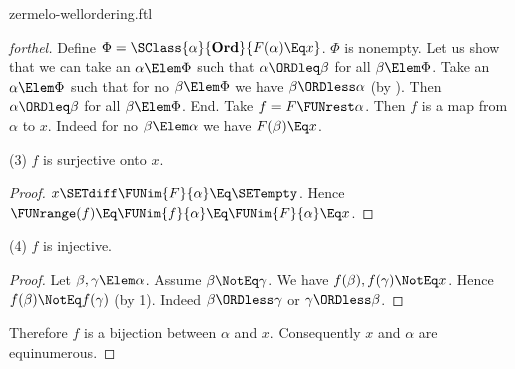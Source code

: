 \documentclass{stex}
\newcommand\Ord{\textbf{Ord}}
\begin{document}
\begin{smodule}{zermelo-wellordering.ftl}
\begin{proof}[forthel]
  Define $\Phi = \SClass{\alpha}{\Ord}{F(\alpha) \Eq x}$.
  $\Phi$ is nonempty.
  Let us show that we can take an $\alpha \Elem \Phi$ such that $\alpha \ORDleq \beta$ for all $\beta \Elem \Phi$.
    Take an $\alpha \Elem \Phi$ such that for no $\beta \Elem \Phi$ we have $\beta \ORDless \alpha$ (by ).
    Then $\alpha \ORDleq \beta$ for all $\beta \Elem \Phi$.
  End.
  Take $f = F \FUNrest \alpha$.
  Then $f$ is a map from $\alpha$ to $x$.
  Indeed for no $\beta \Elem \alpha$ we have $F(\beta) \Eq x$.

  (3) $f$ is surjective onto $x$.
  \begin{proof}
    $x \SETdiff \FUNim{F}{\alpha} \Eq \SETempty$.
    Hence $\FUNrange(f)
      \Eq \FUNim{f}{\alpha}
      \Eq \FUNim{F}{\alpha}
      \Eq x$.
  \end{proof}

  (4) $f$ is injective.
  \begin{proof}
    Let $\beta, \gamma \Elem \alpha$.
    Assume $\beta \NotEq \gamma$.
    We have $f(\beta), f(\gamma) \NotEq x$.
    Hence $f(\beta) \NotEq f(\gamma)$ (by 1).
    Indeed $\beta \ORDless \gamma$ or $\gamma \ORDless \beta$.
  \end{proof}

  Therefore $f$ is a bijection between $\alpha$ and $x$.
  Consequently $x$ and $\alpha$ are equinumerous.
\end{proof}

\printbibliography
{}
\end{smodule}
\end{document}
